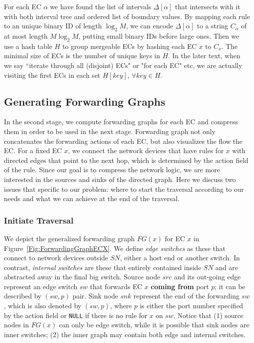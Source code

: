 For each EC $\alpha$ we have found the list of intervals $\Delta[\alpha]$
that intersects with it with both interval tree and ordered list of boundary values.
By mapping each rule to an unique binary ID of length $\log_2 M$,
we can encode $\Delta[\alpha]$ to a string $C_\alpha$ of at most length $M\log_2 M$, putting
small binary IDs before large ones.
Then we use a hash table $H$ to group mergeable ECs by hashing each EC $x$ to $C_x$.
The minimal size of ECs is the number of unique keys in $H$.
In the later text, when we say ``iterate through all (disjoint) ECs" or "for each EC" etc,
we are actually visiting the first ECs in each set $H[key]$, $\forall key \in H$.


\subsection{Generating Forwarding Graphs}
In the second stage, we compute forwarding graphs for each EC and
compress them in order to be used in the next stage.
Forwarding graph not only concatenates the forwarding actions of each EC,
but also visualizes the flow the EC.
For a fixed EC $x$, we connect the network devices that have rules for $x$
with directed edges that point to the next hop,
which is determined by the action field of the rule.
Since our goal is to compress the network logic, we are more interested in the sources
and sinks of the directed graph.
Here we discuss two issues that specific to our problem: where to start the
traversal according to our needs and what we can achieve at the end of the traversal.

\subsubsection{Initiate Traversal}
We depict the generalized forwarding graph $FG(x)$ for EC $x$
in Figure~\ref{Fig:ForwardingGraphECX}.
We define \textit{edge switches} as these that connect to network devices
outside $SN$, either a host end or another switch.
In contrast, \textit{internal switches} are these that entirely contained inside
$SN$ and are abstracted away in the final big switch.
Source node $src$ and its out-going edge represent an edge switch $sw$ that
forwards EC $x$ \textbf{coming from} port $p$; it can be described by $(sw, p)$ pair.
Sink node $snk$ represent the end of the forwarding $sw$,
which is also denoted by $(sw, p)$, where $p$ is either the port number
specified by the action field or \texttt{NULL} if there is no rule for $x$ on $sw$.
Notice that (1) source nodes in $FG(x)$ can only be edge switch,
while it is possible that sink nodes are inner switches;
(2) the inner graph may contain both edge and internal switches.

